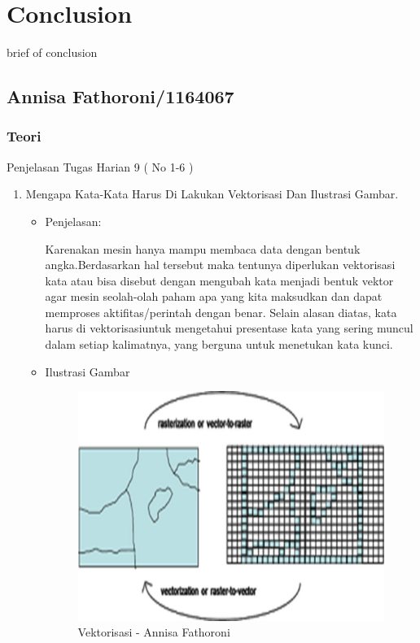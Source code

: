 \chapter{Conclusion}
brief of conclusion

\section{Annisa Fathoroni/1164067}
\subsection{Teori}
Penjelasan Tugas Harian 9 ( No 1-6 )
\begin{enumerate}
\item Mengapa Kata-Kata Harus Di Lakukan Vektorisasi Dan Ilustrasi Gambar.
\begin{itemize}
\item Penjelasan:

Karenakan mesin hanya mampu membaca data dengan bentuk angka.Berdasarkan hal tersebut maka tentunya diperlukan vektorisasi kata atau bisa disebut dengan mengubah kata menjadi bentuk vektor agar mesin seolah-olah paham apa yang kita maksudkan dan dapat memproses aktifitas/perintah dengan benar. Selain alasan diatas, kata harus di vektorisasiuntuk mengetahui presentase kata yang sering muncul dalam setiap kalimatnya, yang berguna untuk menetukan kata kunci.

\item Ilustrasi Gambar

\begin{figure}[!hbtp]
\centering
\includegraphics[scale=0.3]{figures/Chapter5AnnisaFathoroni5.jpg}
\caption{Vektorisasi - Annisa Fathoroni}
\label{Vektorisasi - Annisa Fathoroni}
\end{figure}


\end{itemize}
\end{enumerate}
